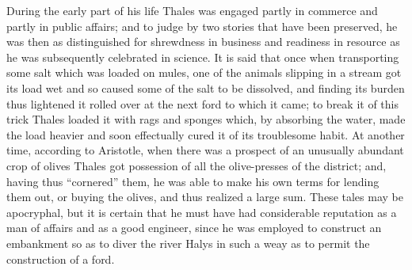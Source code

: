 \documentclass[12pt,oneside]{book}
\begin{document}
During the early part of his life Thales was engaged partly in commerce and partly in public affairs; and to judge by two stories that have been preserved, he was then as distinguished for shrewdness in business and readiness in resource as he was subsequently celebrated in science. It is said that once when transporting some salt which was loaded on mules, one of the animals slipping in a stream got its load wet and so caused some of the salt to be dissolved, and finding its burden thus lightened it rolled over at the next ford to which it came; to break it of this trick Thales loaded it with rags and sponges which, by absorbing the water, made the load heavier and soon effectually cured it of its troublesome habit. At another time, according to Aristotle, when there was a prospect of an unusually abundant crop of olives Thales got possession of all the olive-presses of the district; and, having thus ``cornered'' them, he was able to make his own terms for lending them out, or buying the olives, and thus realized a large sum. These tales may be apocryphal, but it is certain that he must have had considerable reputation as a man of affairs and as a good engineer, since he was employed to construct an embankment so as to diver the river Halys in such a weay as to permit the construction of a ford. \par 
\end{document}
